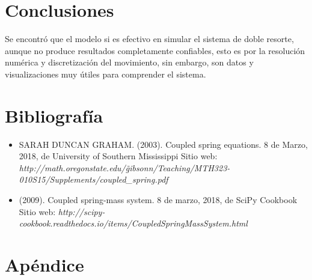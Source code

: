 \documentclass[a4paper]{article}
\begin{document}
\section{Conclusiones}

Se encontró que el modelo si es efectivo en simular el sistema de doble resorte, aunque no produce resultados completamente confiables, esto es por la resolución numérica y discretización del movimiento, sin embargo, son datos y visualizaciones muy útiles para comprender el sistema.


\section{Bibliografía}

\begin{itemize}
\item SARAH DUNCAN GRAHAM. (2003). Coupled spring equations. 8 de Marzo, 2018, de University of Southern Mississippi Sitio web: 
\textit{http://math.oregonstate.edu/\~gibsonn/Teaching/MTH323-010S15/Supplements/coupled\_spring.pdf}


\item (2009). Coupled spring-mass system. 8 de marzo, 2018, de SciPy Cookbook Sitio web: 
\textit{http://scipy-cookbook.readthedocs.io/items/CoupledSpringMassSystem.html}
\end{itemize}



\section{Apéndice}
\end{document}
